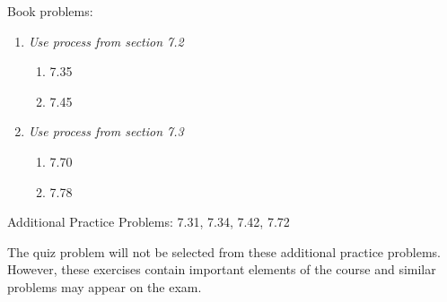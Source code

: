 
Book problems:
\begin{enumerate}
  \item \textit{Use process from section 7.2}
  \begin{enumerate}
    \item 7.35  
    \item 7.45 
  \end{enumerate}
  \item \textit{Use process from section 7.3}
  \begin{enumerate}
    \item 7.70 
    \item 7.78
  \end{enumerate}
\end{enumerate}

Additional Practice Problems: 7.31, 7.34, 7.42, 7.72

\noindent The quiz problem will not be selected from these additional practice problems.  However, these exercises contain important elements of the course and similar problems may appear on the exam.

\iftoggle{flagSoln}{%
\vspace{.5cm}
\rule{\textwidth}{.4pt}
\vspace{.5cm}
\textbf{Solution:}
\begin{enumerate}
  \item[7.35] $|V|_{max} = 40.0$ kN, $|M|_{max} = 55.0$ $kN \cdot m$
  \item[7.45] $|V|_{max} = 6.00$ $kips$, $|M|_{max} = 12.0$ $kip \cdot ft$
  \item[7.70] $|V|_{max} = 44.7$ kN, $|M|_{max} = 35.3$ $kN \cdot m$
  \item[7.78] $90.0$ $kN \cdot m$ at B
\end{enumerate}
}{%
}%
